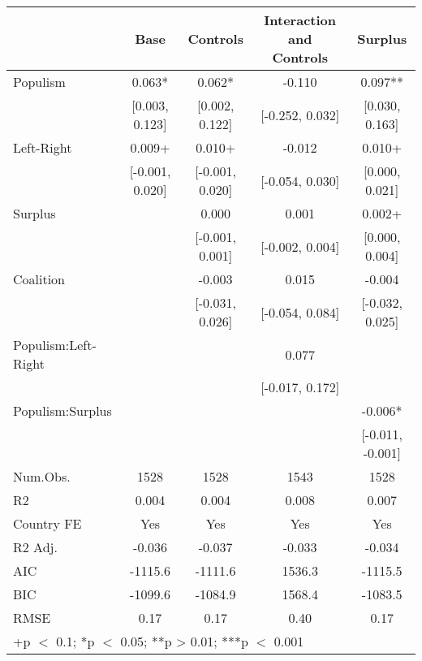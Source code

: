 \begin{table}
\centering\centering\centering
\begin{tabular}[t]{lcccc}
\toprule
  & Base & Controls & Interaction and Controls & Surplus\\
\midrule
Populism & 0.063* & 0.062* & -0.110 & 0.097**\\
 & {}[0.003, 0.123] & {}[0.002, 0.122] & {}[-0.252, 0.032] & {}[0.030, 0.163]\\
Left-Right & 0.009+ & 0.010+ & -0.012 & 0.010+\\
 & {}[-0.001, 0.020] & {}[-0.001, 0.020] & {}[-0.054, 0.030] & {}[0.000, 0.021]\\
Surplus &  & 0.000 & 0.001 & 0.002+\\
 &  & {}[-0.001, 0.001] & {}[-0.002, 0.004] & {}[0.000, 0.004]\\
Coalition &  & -0.003 & 0.015 & -0.004\\
 &  & {}[-0.031, 0.026] & {}[-0.054, 0.084] & {}[-0.032, 0.025]\\
Populism:Left-Right &  &  & 0.077 & \\
 &  &  & {}[-0.017, 0.172] & \\
Populism:Surplus &  &  &  & -0.006*\\
 &  &  &  & {}[-0.011, -0.001]\\
\midrule
Num.Obs. & 1528 & 1528 & 1543 & 1528\\
R2 & 0.004 & 0.004 & 0.008 & 0.007\\
Country FE & Yes & Yes & Yes & Yes\\
R2 Adj. & -0.036 & -0.037 & -0.033 & -0.034\\
AIC & -1115.6 & -1111.6 & 1536.3 & -1115.5\\
BIC & -1099.6 & -1084.9 & 1568.4 & -1083.5\\
RMSE & 0.17 & 0.17 & 0.40 & 0.17\\
\bottomrule
\multicolumn{5}{l}{\rule{0pt}{1em}+p $<$ 0.1; *p $<$ 0.05; **p > 0.01; ***p $<$ 0.001}\\
\end{tabular}
\end{table}
